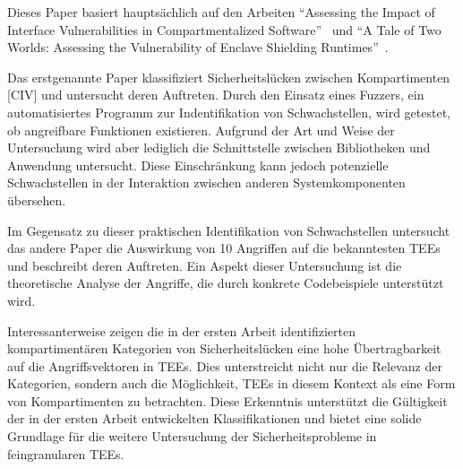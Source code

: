 Dieses Paper basiert hauptsächlich auf den Arbeiten \enquote{Assessing the Impact of Interface Vulnerabilities in Compartmentalized Software}~\cite{CIVPaper} und \enquote{A Tale of Two Worlds: Assessing the Vulnerability of Enclave Shielding Runtimes}~\cite{TEEPaper}. 

Das erstgenannte Paper klassifiziert Sicherheitslücken zwischen Kompartimenten [CIV] und untersucht deren Auftreten. Durch den Einsatz eines Fuzzers, ein automatisiertes Programm zur Indentifikation von Schwachstellen, wird getestet, ob angreifbare Funktionen existieren. Aufgrund der Art und Weise der Untersuchung wird aber lediglich die Schnittstelle zwischen Bibliotheken und Anwendung untersucht. Diese Einschränkung kann jedoch potenzielle Schwachstellen in der Interaktion zwischen anderen Systemkomponenten übersehen.

Im Gegensatz zu dieser praktischen Identifikation von Schwachstellen untersucht das andere Paper die Auswirkung von 10 Angriffen auf die bekanntesten TEEs und beschreibt deren Auftreten. Ein Aspekt dieser Untersuchung ist die theoretische Analyse der Angriffe, die durch konkrete Codebeispiele unterstützt wird. 

Interessanterweise zeigen die in der ersten Arbeit identifizierten kompartimentären Kategorien von Sicherheitslücken eine hohe Übertragbarkeit auf die Angriffsvektoren in TEEs. Dies unterstreicht nicht nur die Relevanz der Kategorien, sondern auch die Möglichkeit, TEEs in diesem Kontext als eine Form von Kompartimenten zu betrachten. Diese Erkenntnis unterstützt die Gültigkeit der in der ersten Arbeit entwickelten Klassifikationen und bietet eine solide Grundlage für die weitere Untersuchung der Sicherheitsprobleme in feingranularen TEEs.
